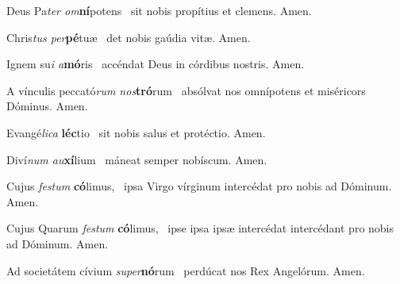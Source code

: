 \documentclass[invitatoriale-romanum.tex]{subfiles}
\begin{document}

 Deus Pa\textit{ter om}\textbf{ní}potens~\GreSpecial{*}
sit nobis propítius et clemens.
\hspace{\specialcharhsep}\rr Amen.

 Chris\textit{tus per}\textbf{pé}tuæ~\GreSpecial{*}
det nobis gaúdia vitæ.
\hspace{\specialcharhsep}\rr Amen.

 Ignem su\textit{i a}\textbf{mó}ris~\GreSpecial{*}
accéndat Deus in córdibus nostris.
\hspace{\specialcharhsep}\rr Amen.

\pagebreak
\null



A vínculis peccató\textit{rum nos}\textbf{tró}rum~\GreSpecial{*}
absólvat nos omnípotens et miséricors Dóminus.
\hspace{\specialcharhsep}\rr Amen.


Evangé\textit{lica} \textbf{léc}tio~\GreSpecial{*}
sit nobis salus et protéctio.
\hspace{\specialcharhsep}\rr Amen.


Diví\textit{num au}\textbf{xí}lium~\GreSpecial{*}
máneat semper nobíscum.
\hspace{\specialcharhsep}\rr Amen.


Cujus \textit{festum} \textbf{có}limus,~\GreSpecial{*}
ipsa Virgo vírginum intercédat pro nobis ad Dóminum.
\hspace{\specialcharhsep}\rr Amen.


Cujus  Quarum\rubric{)} \textit{festum} \textbf{có}limus,~\GreSpecial{*}
ipse  ipsa  ipsæ\rubric{)}
intercédat  intercédant\rubric{)} pro nobis ad Dóminum.
\hspace{\specialcharhsep}\rr Amen.

Ad societátem cívium \textit{super}\textbf{nó}rum~\GreSpecial{*}
perdúcat nos Rex Angelórum.
\hspace{\specialcharhsep}\rr Amen.
\end{document}
